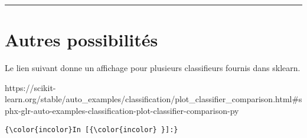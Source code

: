 \documentclass[11pt]{article}
\begin{document}
\begin{center}\rule{0.5\linewidth}{\linethickness}\end{center}

    \section{Autres possibilités}\label{autres-possibilituxe9s}

Le lien suivant donne un affichage pour plusieurs classifieurs fournis
dans sklearn.

https://scikit-learn.org/stable/auto\_examples/classification/plot\_classifier\_comparison.html\#sphx-glr-auto-examples-classification-plot-classifier-comparison-py

    \begin{Verbatim}[commandchars=\\\{\}]
{\color{incolor}In [{\color{incolor} }]:} 
\end{Verbatim}


    
    
    
    
\end{document}
